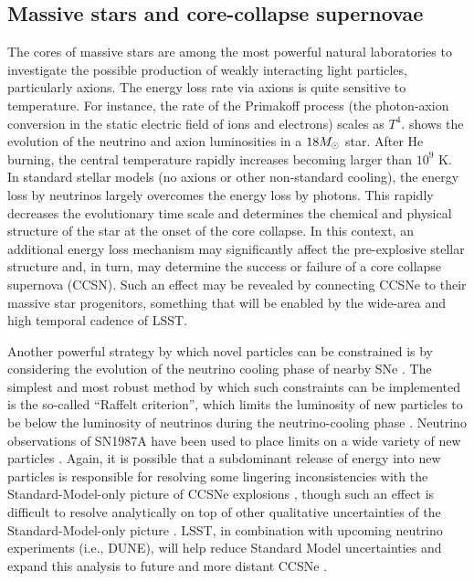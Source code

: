 \subsection{Massive stars and core-collapse supernovae}

The cores of massive stars are among the most powerful natural laboratories to investigate the possible production of weakly interacting light particles, particularly axions. 
The energy loss rate via axions is quite sensitive to temperature. 
For instance, the rate of the Primakoff process (the photon-axion conversion in the static electric field of ions and electrons) scales as $T^4$. 
 shows the evolution of the neutrino and axion luminosities in a $18M_\odot$ star. 
After He burning, the central temperature rapidly increases becoming larger than $10^9$ K. 
In standard stellar models (no axions or other non-standard cooling), the energy loss by neutrinos largely overcomes the energy loss by photons. This rapidly decreases the evolutionary time scale and determines the chemical and physical structure of the star at the onset of the core collapse. 
In this context, an additional energy loss mechanism may significantly affect the pre-explosive stellar structure and, in turn, may determine the success or failure of a core collapse supernova (CCSN). 
Such an effect may be revealed by connecting CCSNe to their massive star progenitors, something that will be enabled by the wide-area and high temporal cadence of LSST.

Another powerful strategy by which novel particles can be constrained is by considering the evolution of the neutrino cooling phase of nearby SNe  \citep[\ie, SN1987A][]{Burrows:1988, Raffelt:1988}.
The simplest and most robust method by which such constraints can be implemented is the so-called ``Raffelt criterion'', which limits the luminosity of new particles to be below the luminosity of neutrinos during the neutrino-cooling phase \citep{hep-ph/0611350}.
Neutrino observations of SN1987A have been used to place limits on a wide variety of new particles \citep{hep-ph/0207098, 1611.03864, 1611.05852, 1803.00993, 1808.10136}.
Again, it is possible that a subdominant release of energy into new particles is responsible for resolving some lingering inconsistencies with the Standard-Model-only picture of CCSNe explosions \citep{0806.4273, 1805.07381}, though such an effect is difficult to resolve analytically on top of other qualitative uncertainties of the Standard-Model-only picture \citep{1809.05106, 1811.11178}.
LSST, in combination with upcoming neutrino experiments (i.e., DUNE), will help reduce Standard Model uncertainties and expand this analysis to future and more distant CCSNe \citep{1807.10334}.

